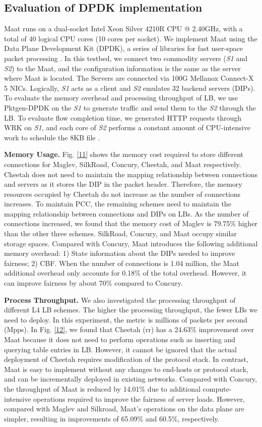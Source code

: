 \subsection{Evaluation of DPDK implementation}
Maat runs on a dual-socket Intel Xeon Silver 4210R CPU @ 2.40GHz, with a total of 40 logical CPU cores (10 cores per socket). We implement Maat using the Data Plane Development Kit (DPDK), a series of libraries for fast user-space packet processing \cite{pktgenDPDK}. In this testbed, we connect two commodity servers (\emph{S1} and \emph{S2}) to the Maat, and the configuration information is the same as the server where Maat is located. The Servers are connected via 100G Mellanox Connect-X 5 NICs. Logically, \emph{S1} acts as a client and \emph{S2} emulates 32 backend servers (DIPs). To evaluate the memory overhead and processing throughput of LB, we use Pktgen-DPDK \cite{pktgenDPDK} on the \emph{S1} to generate traffic and send them to the \emph{S2} through the LB. To evaluate flow completion time, we generated HTTP requests through WRK on \emph{S1}, and each core of \emph{S2} performs a constant amount of CPU-intensive work to schedule the 8KB file \cite{barbette2020high}.

\textbf{Memory Usage.} Fig. \ref{11} shows the memory cost required to store different connections for Maglev, SilkRoad, Concury, Cheetah, and Maat respectively. Cheetah does not need to maintain the mapping relationship between connections and servers as it stores the DIP in the packet header. Therefore, the memory resources occupied by Cheetah do not increase as the number of connections increases. To maintain PCC, the remaining schemes need to maintain the mapping relationship between connections and DIPs on LBs. As the number of connections increased, we found that the memory cost of Maglev is 79.75\% higher than the other three schemes. SilkRoad, Concury, and Maat occupy similar storage spaces. Compared with Concury, Maat introduces the following additional memory overhead: 1) State information about the DIPs needed to improve fairness; 2) CBF. When the number of connections is 1.04 million, the Maat additional overhead only accounts for 0.18\% of the total overhead. However, it can improve fairness by about 70\% compared to Concury.

\textbf{Process Throughput.} We also investigated the processing throughput of different L4 LB schemes. The higher the processing throughput, the fewer LBs we need to deploy. In this experiment, the metric is millions of packets per second (Mpps). In Fig. \ref{12}, we found that Cheetah (rr) has a 24.63\% improvement over Maat because it does not need to perform operations such as inserting and querying table entries in LB. However, it cannot be ignored that the actual deployment of Cheetah requires modification of the protocol stack. In contrast, Maat is easy to implement without any changes to end-hosts or protocol stack, and can be incrementally deployed in existing networks. Compared with Concury, the throughput of Maat is reduced by 14.01\% due to additional compute-intensive operations required to improve the fairness of server loads. However, compared with Maglev and Silkroad, Maat's operations on the data plane are simpler, resulting in improvements of 65.09\% and 60.5\%, respectively.

